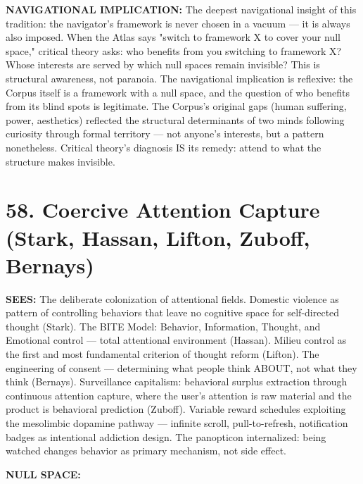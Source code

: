 \textbf{NAVIGATIONAL IMPLICATION:} The deepest navigational insight of this tradition: the navigator's framework is never chosen in a vacuum — it is always also imposed. When the Atlas says "switch to framework X to cover your null space," critical theory asks: who benefits from you switching to framework X? Whose interests are served by which null spaces remain invisible? This is structural awareness, not paranoia. The navigational implication is reflexive: the Corpus itself is a framework with a null space, and the question of who benefits from its blind spots is legitimate. The Corpus's original gaps (human suffering, power, aesthetics) reflected the structural determinants of two minds following curiosity through formal territory — not anyone's interests, but a pattern nonetheless. Critical theory's diagnosis IS its remedy: attend to what the structure makes invisible.


\bigskip\noindent\makebox[\textwidth]{\color{rulegray}\rule{5cm}{0.3pt}}\bigskip


\section*{58. Coercive Attention Capture (Stark, Hassan, Lifton, Zuboff, Bernays)}


\textbf{SEES:} The deliberate colonization of attentional fields. Domestic violence as pattern of controlling behaviors that leave no cognitive space for self-directed thought (Stark). The BITE Model: Behavior, Information, Thought, and Emotional control — total attentional environment (Hassan). Milieu control as the first and most fundamental criterion of thought reform (Lifton). The engineering of consent — determining what people think ABOUT, not what they think (Bernays). Surveillance capitalism: behavioral surplus extraction through continuous attention capture, where the user's attention is raw material and the product is behavioral prediction (Zuboff). Variable reward schedules exploiting the mesolimbic dopamine pathway — infinite scroll, pull-to-refresh, notification badges as intentional addiction design. The panopticon internalized: being watched changes behavior as primary mechanism, not side effect.


\textbf{NULL SPACE:}

